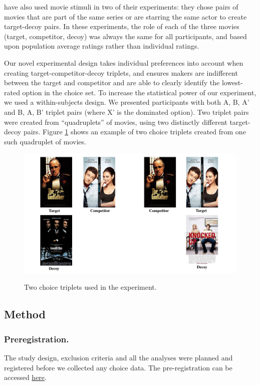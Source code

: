 \documentclass[12pt, a4paper]{article}
\begin{document}
  have also used movie stimuli in two of their experiments: they chose pairs of movies that are part of the same series or are starring the same actor to create target-decoy pairs. In these experiments, the role of each of the three movies (target, competitor, decoy) was always the same for all participants, and based upon population average ratings rather than individual ratings.




Our novel experimental design takes individual preferences into account when creating target-competitor-decoy triplets, and ensures makers are indifferent between the target and competitor and are able to clearly identify the lowest-rated option in the choice set. To increase the statistical power of our experiment, we used a within-subjects design. We presented participants with both A, B, A' and B, A, B' triplet pairs (where X' is the dominated option). Two triplet pairs were created from ``quadruplets'' of movies, using two distinctly different target-decoy pairs. Figure \ref{fig:quadruplets} shows an example of two choice triplets created from one such quadruplet of movies.


\begin{figure}
\centering
		 \caption{Two choice triplets used in the experiment.}
\includegraphics[width=1\textwidth]{figure1.pdf}
\label{fig:quadruplets}
\end{figure}

\subsection*{Method}

\subsubsection*{Preregistration.}
The study design, exclusion criteria and all the analyses were planned and registered before we collected any choice data. The pre-registration can be accessed \href{https://osf.io/fme6c/?view_only=31da4193689f4247a76af93b2f98fcef}{here}.
\end{document}
